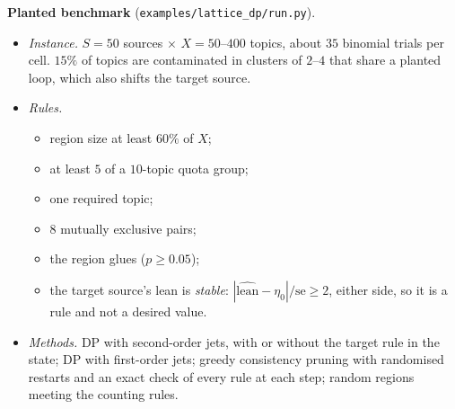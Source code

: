 \documentclass[11pt]{article}
\theoremstyle{definition}
\theoremstyle{remark}
\begin{document}
\textbf{Planted benchmark} (\texttt{examples/lattice\_dp/run.py}).
\begin{itemize}
  \item \emph{Instance.} $S=50$ sources $\times$ $X=50$--$400$ topics, about $35$ binomial trials per cell. $15\%$ of topics are contaminated in clusters of $2$--$4$ that share a planted loop, which also shifts the target source.
  \item \emph{Rules.}
  \begin{itemize}
    \item region size at least $60\%$ of $X$;
    \item at least $5$ of a $10$-topic quota group;
    \item one required topic;
    \item $8$ mutually exclusive pairs;
    \item the region glues ($p\ge0.05$);
    \item the target source's lean is \emph{stable}: $|\widehat{\text{lean}}-\eta_0|/\mathrm{se}\ge2$, either side, so it is a rule and not a desired value.
  \end{itemize}
  \item \emph{Methods.} DP with second-order jets, with or without the target rule in the state; DP with first-order jets; greedy consistency pruning with randomised restarts and an exact check of every rule at each step; random regions meeting the counting rules.
\end{itemize}

\begin{table}[!htbp]\centering\small
{}
\caption{Dynamic programming on the gluing lattice (200 proposals per method; every feasible region gets the outcome's sign right).}\label{tab:latticedp}
\end{table}
\end{document}
